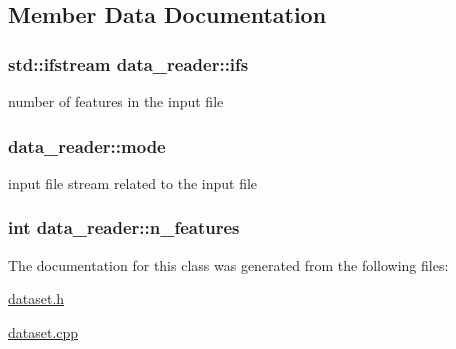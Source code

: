 \subsection{Member Data Documentation}
\hypertarget{classdata__reader_a1a39328bde93e7f132a1ca7eb6642311}{
\subsubsection[{ifs}]{\setlength{\rightskip}{0pt plus 5cm}std\+::ifstream data\+\_\+reader\+::ifs\hspace{0.3cm}{\ttfamily [private]}}}\label{classdata__reader_a1a39328bde93e7f132a1ca7eb6642311}
number of features in the input file \hypertarget{classdata__reader_a4132a7abcf03cca64e2eb204e70fffd3}{
\subsubsection[{mode}]{ data\+\_\+reader\+::mode\hspace{0.3cm}{\ttfamily [private]}}}\label{classdata__reader_a4132a7abcf03cca64e2eb204e70fffd3}
input file stream related to the input file \hypertarget{classdata__reader_ab77f1bebd79be09216119e127b463434}{
\subsubsection[{n\+\_\+features}]{\setlength{\rightskip}{0pt plus 5cm}int data\+\_\+reader\+::n\+\_\+features\hspace{0.3cm}{\ttfamily [private]}}}\label{classdata__reader_ab77f1bebd79be09216119e127b463434}


The documentation for this class was generated from the following files\+:\begin{DoxyCompactItemize}
\item 
\hyperlink{dataset_8h}{dataset.\+h}\item 
\hyperlink{dataset_8cpp}{dataset.\+cpp}\end{DoxyCompactItemize}
